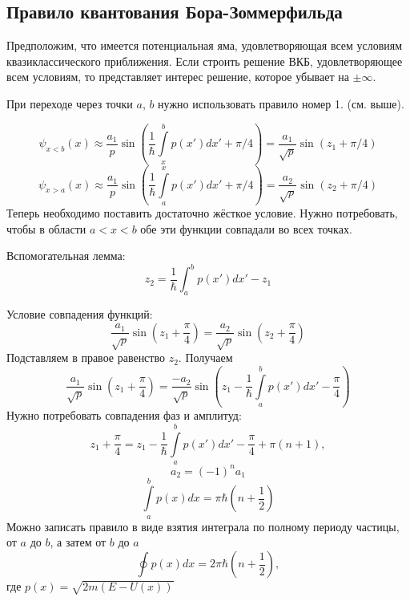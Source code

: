 \subsection{Правило квантования Бора-Зоммерфильда}

Предположим, что имеется потенциальная яма, удовлетворяющая всем условиям квазиклассического приближения.
%
Если строить решение ВКБ, удовлетворяющее всем условиям, то представляет интерес решение, которое убывает на $\pm \infty$. 

При переходе через точки $a$, $b$ нужно использовать правило номер 1. (см. выше).

$$
    \psi_{x < b} (x) \approx \dfrac{a_1}{p} \sin \left(
        \dfrac{1}{\hbar} \int\limits_{x}^{b} p(x') dx' + \pi/4
    \right) = \dfrac{a_1}{\sqrt{p}} \sin \left(
        z_1 + \pi/4
    \right)
$$
$$
    \psi_{x > a} (x) \approx \dfrac{a_1}{p} \sin \left(
        \dfrac{1}{\hbar} \int\limits_{a}^{x} p(x') dx' + \pi/4
    \right) = \dfrac{a_2}{\sqrt{p}} \sin \left(
        z_2 + \pi/4
    \right)
$$
Теперь необходимо поставить достаточно жёсткое условие. Нужно потребовать, чтобы в области $a < x < b$ обе эти функции совпадали во всех точках. 
 
Вспомогательная лемма:
$$
    z_2 = \dfrac{1}{\hbar}\int_{a}^{b} p(x') dx' - z_1
$$

Условие совпадения функций:
$$
    \dfrac{a_1}{\sqrt p} \sin \left(
        z_1 + \dfrac{\pi}{4}
    \right) = \dfrac{a_2}{\sqrt p} \sin \left(
        z_2 + \dfrac{\pi}{4}
    \right)
$$
Подставляем в правое равенство $z_2$. Получаем
$$
    \dfrac{a_1}{\sqrt p} \sin \left(
        z_1 + \dfrac{\pi}{4}
    \right) = \dfrac{-a_2}{\sqrt p} \sin \left(
        z_1 - \dfrac{1}{\hbar} \int\limits_{a}^{b} p(x') dx' - \dfrac{\pi}{4}
    \right)
$$
Нужно потребовать совпадения фаз и амплитуд:
$$
    z_1 + \dfrac{\pi}{4} = z_1 - \dfrac{1}{\hbar} \int\limits_{a}^{b} p(x') dx' - \dfrac{\pi}{4} + \pi(n+1),
$$
$$
    a_2 = (-1)^n a_1
$$
$$
    \boxed{
        \int\limits_a^b p(x)dx = \pi \hbar \left(n + \dfrac{1}{2}\right)
    }
$$
Можно записать правило в виде взятия интеграла по полному периоду частицы, от $a$ до $b$, а затем от $b$ до $a$
$$
    \oint p(x) dx = 2 \pi \hbar \left(
        n + \dfrac{1}{2}
    \right),
$$
где $p(x) = \sqrt{2m (E - U(x))}$

